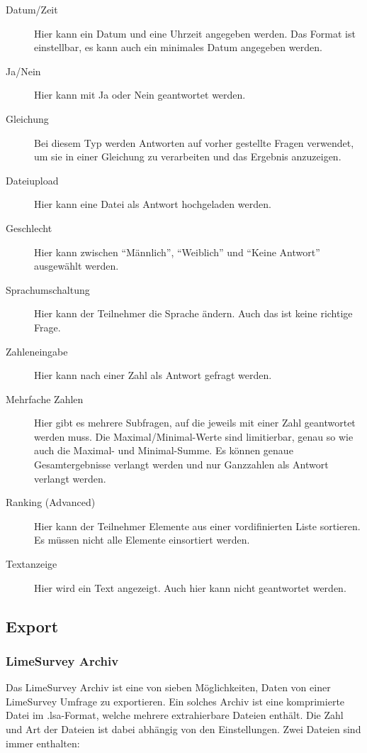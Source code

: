 \begin{description}
	\item[Datum/Zeit] Hier kann ein Datum und eine Uhrzeit angegeben werden. Das Format ist einstellbar, es kann auch ein minimales Datum angegeben werden.
	\item[Ja/Nein] Hier kann mit Ja oder Nein geantwortet werden.
	\item[Gleichung] Bei diesem Typ werden Antworten auf vorher gestellte Fragen verwendet, um sie in einer Gleichung zu verarbeiten und das Ergebnis anzuzeigen.
	\item[Dateiupload] Hier kann eine Datei als Antwort hochgeladen werden.
	\item[Geschlecht] Hier kann zwischen \enquote{Männlich}, \enquote{Weiblich} und \enquote{Keine Antwort} ausgewählt werden.
	\item[Sprachumschaltung] Hier kann der Teilnehmer die Sprache ändern. Auch das ist keine richtige Frage.
	\item[Zahleneingabe] Hier kann nach einer Zahl als Antwort gefragt werden.
	\item[Mehrfache Zahlen] Hier gibt es mehrere Subfragen, auf die jeweils mit einer Zahl geantwortet werden muss. Die Maximal/Minimal-Werte sind limitierbar, genau so wie auch die Maximal- und Minimal-Summe. Es können genaue Gesamtergebnisse verlangt werden und nur Ganzzahlen als Antwort verlangt werden.
	\item[Ranking (Advanced)] Hier kann der Teilnehmer Elemente aus einer vordifinierten Liste sortieren. Es müssen nicht alle Elemente einsortiert werden.
	\item[Textanzeige] Hier wird ein Text angezeigt. Auch hier kann nicht geantwortet werden.
\end{description}

\subsection{Export}
\subsubsection{LimeSurvey Archiv}
\label{m:lsa}
Das LimeSurvey Archiv ist eine von sieben Möglichkeiten, Daten von einer LimeSurvey Umfrage zu exportieren.
Ein solches Archiv ist eine komprimierte Datei im .lsa-Format, welche mehrere extrahierbare Dateien enthält.
Die Zahl und Art der Dateien ist dabei abhängig von den Einstellungen. Zwei Dateien sind immer enthalten:

